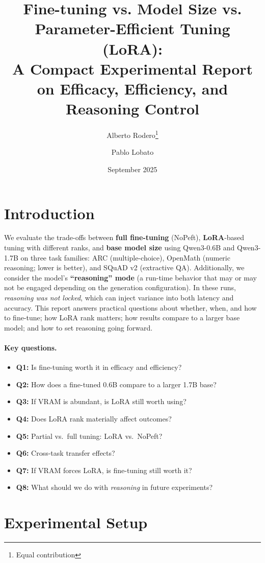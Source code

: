 \documentclass[11pt,a4paper]{article}
\title{Fine-tuning vs. Model Size vs. Parameter-Efficient Tuning (LoRA):\\
A Compact Experimental Report on Efficacy, Efficiency, and Reasoning Control}
\author{Alberto Rodero\thanks{Equal contribution} \and Pablo Lobato\footnotemark[1]}
\date{September 2025}
\begin{document}
\maketitle

\section{Introduction}
We evaluate the trade-offs between \textbf{full fine-tuning} (NoPeft), \textbf{LoRA}-based tuning with different ranks, and \textbf{base model size} using Qwen3-0.6B and Qwen3-1.7B on three task families: ARC (multiple-choice), OpenMath (numeric reasoning; lower is better), and SQuAD v2 (extractive QA). 
Additionally, we consider the model's \textbf{``reasoning'' mode} (a run-time behavior that may or may not be engaged depending on the generation configuration). In these runs, \emph{reasoning was not locked}, which can inject variance into both latency and accuracy. This report answers practical questions about whether, when, and how to fine-tune; how LoRA rank matters; how results compare to a larger base model; and how to set reasoning going forward.

\paragraph{Key questions.}
\begin{itemize}
  \item \textbf{Q1:} Is fine-tuning worth it in efficacy and efficiency?
  \item \textbf{Q2:} How does a fine-tuned 0.6B compare to a larger 1.7B base?
  \item \textbf{Q3:} If VRAM is abundant, is LoRA still worth using?
  \item \textbf{Q4:} Does LoRA rank materially affect outcomes?
  \item \textbf{Q5:} Partial vs.\ full tuning: LoRA vs.\ NoPeft?
  \item \textbf{Q6:} Cross-task transfer effects?
  \item \textbf{Q7:} If VRAM forces LoRA, is fine-tuning still worth it?
  \item \textbf{Q8:} What should we do with \emph{reasoning} in future experiments?
\end{itemize}

\section{Experimental Setup}
\end{document}
